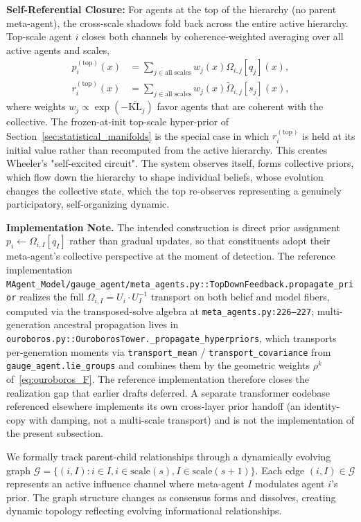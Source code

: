\documentclass[11pt]{article}
\begin{document}
\textbf{Self-Referential Closure:} For agents at the top of the hierarchy (no parent meta-agent), the cross-scale shadows fold back across the entire active hierarchy. Top-scale agent $i$ closes both channels by coherence-weighted averaging over all active agents and scales,
\begin{align}
p_i^{(\text{top})}(x) &= \sum_{j \in \text{all scales}} w_j(x)  \Omega_{i,j}[q_j](x), \\
r_i^{(\text{top})}(x) &= \sum_{j \in \text{all scales}} w_j(x)  \tilde\Omega_{i,j}[s_j](x),
\end{align}
where weights $w_j \propto \exp(-\overline{\mathrm{KL}}_j)$ favor agents that are coherent with the collective. The frozen-at-init top-scale hyper-prior of Section~\ref{sec:statistical_manifolds} is the special case in which $r_i^{(\text{top})}$ is held at its initial value rather than recomputed from the active hierarchy. This creates Wheeler's "self-excited circuit".  The system observes itself, forms collective priors, which flow down the hierarchy to shape individual beliefs, whose evolution changes the collective state, which the top re-observes representing a genuinely participatory, self-organizing dynamic.

\textbf{Implementation Note.} The intended construction is direct prior assignment $p_i \leftarrow \Omega_{i,I}[q_I]$ rather than gradual updates, so that constituents adopt their meta-agent's collective perspective at the moment of detection. The reference implementation \texttt{MAgent\_Model/gauge\_agent/meta\_agents.py::TopDownFeedback.propagate\_prior} realizes the full $\Omega_{i,I} = U_i \cdot U_I^{-1}$ transport on both belief and model fibers, computed via the transposed-solve algebra at \texttt{meta\_agents.py:226--227}; multi-generation ancestral propagation lives in \texttt{ouroboros.py::OuroborosTower.\_propagate\_hyperpriors}, which transports per-generation moments via \texttt{transport\_mean} / \texttt{transport\_covariance} from \texttt{gauge\_agent.lie\_groups} and combines them by the geometric weights $\rho^k$ of~\eqref{eq:ouroboros_F}. The reference implementation therefore closes the realization gap that earlier drafts deferred. A separate transformer codebase referenced elsewhere implements its own cross-layer prior handoff (an identity-copy with damping, not a multi-scale transport) and is not the implementation of the present subsection.

We formally track parent-child relationships through a dynamically evolving graph $\mathcal{G} = \{(i, I) : i \in I,  i \in \text{scale}(s),  I \in \text{scale}(s+1)\}$. Each edge $(i, I) \in \mathcal{G}$ represents an active influence channel where meta-agent $I$ modulates agent $i$'s prior. The graph structure changes as consensus forms and dissolves, creating dynamic topology reflecting evolving informational relationships.
\end{document}
